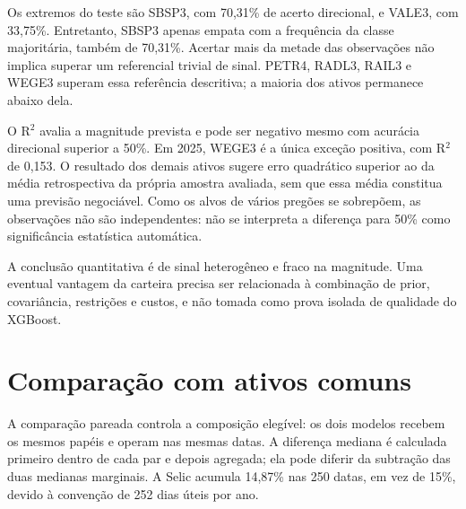 Os extremos do teste são SBSP3, com 70,31\% de acerto direcional, e VALE3, com 33,75\%. Entretanto, SBSP3 apenas empata com a frequência da classe majoritária, também de 70,31\%. Acertar mais da metade das observações não implica superar um referencial trivial de sinal. PETR4, RADL3, RAIL3 e WEGE3 superam essa referência descritiva; a maioria dos ativos permanece abaixo dela.

O R$^{2}$ avalia a magnitude prevista e pode ser negativo mesmo com acurácia direcional superior a 50\%. Em 2025, WEGE3 é a única exceção positiva, com R$^{2}$ de 0,153. O resultado dos demais ativos sugere erro quadrático superior ao da média retrospectiva da própria amostra avaliada, sem que essa média constitua uma previsão negociável. Como os alvos de vários pregões se sobrepõem, as observações não são independentes: não se interpreta a diferença para 50\% como significância estatística automática.

A conclusão quantitativa é de sinal heterogêneo e fraco na magnitude. Uma eventual vantagem da carteira precisa ser relacionada à combinação de prior, covariância, restrições e custos, e não tomada como prova isolada de qualidade do XGBoost.



\section{Comparação com ativos comuns}
A comparação pareada controla a composição elegível: os dois modelos recebem os mesmos papéis e operam nas mesmas datas. A diferença mediana é calculada primeiro dentro de cada par e depois agregada; ela pode diferir da subtração das duas medianas marginais. A Selic acumula 14,87\% nas 250 datas, em vez de 15\%, devido à convenção de 252 dias úteis por ano.

